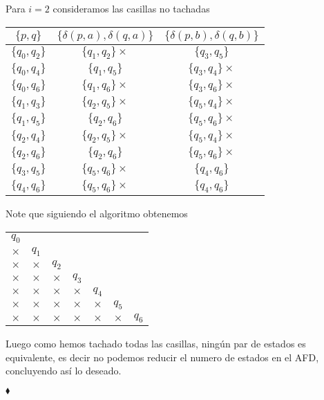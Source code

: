 Para $i=2$ consideramos las casillas no tachadas
            \begin{center}
                \begin{tabular}{c||c|c}
                  $\{p,q\}$ & $\{\delta(p,a),\delta(q,a)\}$ & $\{\delta(p,b),\delta(q,b)\}$\\ \hline
                  $\{q_0,q_2\}$ & $\{q_1,q_2\}\times$ & $\{q_3,q_5\}$ \\ \hline
                  $\{q_0,q_4\}$ & $\{q_1,q_5\}$ & $\{q_3,q_4\}\times$ \\ \hline
                  $\{q_0,q_6\}$ & $\{q_1,q_6\}\times$ & $\{q_3,q_6\}\times$ \\ \hline
                  $\{q_1,q_3\}$ & $\{q_2,q_5\}\times$ & $\{q_5,q_4\}\times$ \\ \hline
                  $\{q_1,q_5\}$ & $\{q_2,q_6\}$ & $\{q_5,q_6\}\times$ \\ \hline
                  $\{q_2,q_4\}$ & $\{q_2,q_5\}\times$ & $\{q_5,q_4\}\times$ \\ \hline
                  $\{q_2,q_6\}$ & $\{q_2,q_6\}$ & $\{q_5,q_6\}\times$ \\ \hline
                  $\{q_3,q_5\}$ & $\{q_5,q_6\}\times$ & $\{q_4,q_6\}$ \\ \hline
                  $\{q_4,q_6\}$ & $\{q_5,q_6\}\times$ & $\{q_4,q_6\}$ \\ \hline
                \end{tabular}
            \end{center}

Note que siguiendo el algoritmo obtenemos
\begin{center}
    \begin{tabular}{ccccccc}
    $q_0$ \\ \cline{1-1}
    \multicolumn{1}{|c|}{$\times$} & $q_1$ \\ \cline{1-2}
    \multicolumn{1}{|c|}{$\times$} & \multicolumn{1}{|c|}{$\times$} & $q_2$ \\ \cline{1-3}
    \multicolumn{1}{|c|}{$\times$} & \multicolumn{1}{|c|}{$\times$} & \multicolumn{1}{|c|}{$\times$} & $q_3$ \\ \cline{1-4}
    \multicolumn{1}{|c|}{$\times$} & \multicolumn{1}{|c|}{$\times$} & \multicolumn{1}{|c|}{$\times$} & \multicolumn{1}{|c|}{$\times$} & $q_4$ \\ \cline{1-5}
    \multicolumn{1}{|c|}{$\times$} & \multicolumn{1}{|c|}{$\times$} & \multicolumn{1}{|c|}{$\times$} & \multicolumn{1}{|c|}{$\times$} & \multicolumn{1}{|c|}{$\times$} & $q_5$ \\ \cline{1-6}
    \multicolumn{1}{|c|}{$\times$} & \multicolumn{1}{|c|}{$\times$} & \multicolumn{1}{|c|}{$\times$} & \multicolumn{1}{|c|}{$\times$} & \multicolumn{1}{|c|}{$\times$} & \multicolumn{1}{|c|}{$\times$} & $q_6$ \\ \cline{1-6}
    \end{tabular}
\end{center}
Luego como hemos tachado todas las casillas, ningún par de estados es equivalente, es decir no podemos reducir el numero de estados en el AFD, concluyendo así lo deseado.

\hfill$\blacklozenge$